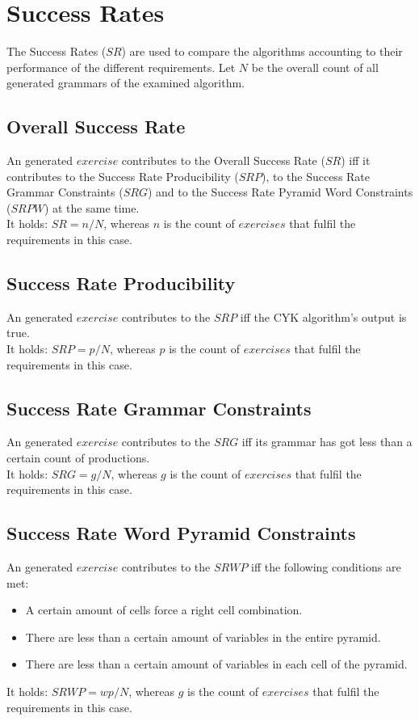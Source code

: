 
\section{Success Rates}
\noindent The Success Rates ($SR$) are used to compare the algorithms accounting to their performance of the different requirements. Let $N$ be the overall count of all generated grammars of the examined algorithm.
\subsection{Overall Success Rate}
An generated $exercise$ contributes to the Overall Success Rate ($SR$) iff it contributes to the Success Rate Producibility ($SRP$), to the Success Rate Grammar Constraints ($SRG$) and to the Success Rate Pyramid Word Constraints ($SRPW$) at the same time.\\
It holds: $SR = n / N$, whereas $n$ is the count of $exercises$ that fulfil the requirements in this case.
\subsection{Success Rate Producibility}
An generated $exercise$ contributes to the $SRP$ iff the CYK algorithm's output is true.\\
It holds: $SRP = p / N$, whereas $p$ is the count of $exercises$ that fulfil the requirements in this case.
\subsection{Success Rate Grammar Constraints}
An generated $exercise$ contributes to the $SRG$ iff its grammar has got less than a certain count of productions.\\
It holds: $SRG = g / N$, whereas $g$ is the count of $exercises$ that fulfil the requirements in this case.
\subsection{Success Rate Word Pyramid Constraints}
An generated $exercise$ contributes to the $SRWP$ iff the following conditions are met:
	\begin{itemize}
	\item A certain amount of cells force a right cell combination.
	\item There are less than a certain amount of variables in the entire pyramid.
	\item There are less than a certain amount of variables in each cell of the pyramid.
\end{itemize}
It holds: $SRWP = wp / N$, whereas $g$ is the count of $exercises$ that fulfil the requirements in this case.

\pagebreak